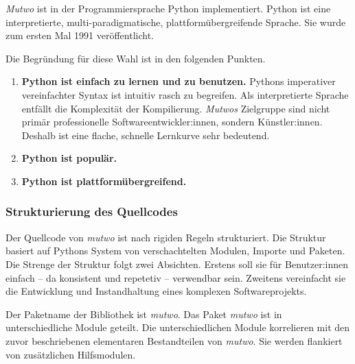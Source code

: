 \documentclass[12pt,a4paper,ngerman]{article}
\begin{document}
\emph{Mutwo} ist in der Programmiersprache Python implementiert.
Python ist eine interpretierte, multi-paradigmatische, plattformübergreifende Sprache.
Sie wurde zum ersten Mal 1991 veröffentlicht.

\bigskip

Die Begründung für diese Wahl ist in den folgenden Punkten.

\begin{enumerate}
    \item{
            \textbf{Python ist einfach zu lernen und zu benutzen.}
            Pythons imperativer vereinfachter Syntax ist intuitiv rasch zu begreifen.
            Als interpretierte Sprache entfällt die Komplexität der Kompilierung.
            \emph{Mutwos} Zielgruppe sind nicht primär  professionelle Softwareentwickler:innen, sondern Künstler:innen.
            Deshalb ist eine flache, schnelle Lernkurve sehr bedeutend.
    }
    \item{
            \textbf{Python ist populär.}
    }
    \item{
            \textbf{Python ist plattformübergreifend.}
    }
\end{enumerate}


\subsubsection{Strukturierung des Quellcodes}
\label{quellcodeStruktur}

Der Quellcode von \emph{mutwo} ist nach rigiden Regeln strukturiert.
Die Struktur basiert auf Pythons System von verschachtelten Modulen, Importe und Paketen.
Die Strenge der Struktur folgt zwei Absichten.
Erstens soll sie für Benutzer:innen einfach -- da konsistent und repetetiv -- verwendbar sein.
Zweitens vereinfacht sie die Entwicklung und Instandhaltung eines komplexen Softwareprojekts.

\bigskip

Der Paketname der Bibliothek ist \emph{mutwo}.
% 
% 
% 
Das Paket \emph{mutwo} ist in unterschiedliche Module geteilt.
Die unterschiedlichen Module korrelieren mit den zuvor beschriebenen elementaren Bestandteilen von \emph{mutwo}.
Sie werden flankiert von zusätzlichen Hilfsmodulen.
\end{document}
